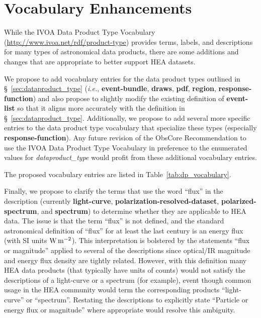 \documentclass[11pt,a4paper]{ivoa}
\begin{document}
\section{Vocabulary Enhancements}
\label{sec:voc}

While the IVOA Data Product Type Vocabulary (\url{http://www.ivoa.net/rdf/product-type}) provides terms, labels, and descriptions for many types of astronomical data products, there are some additions and changes that are appropriate to better support HEA datasets.

We propose to add vocabulary entries for the data product types outlined in \S~\ref{sec:dataproduct_type} ({\em i.e.\/}, {\bf event-bundle}, {\bf draws}, {\bf pdf}, {\bf region}, {\bf response-function}) and also propose to slightly modify the existing definition of {\bf event-list} so that it aligns more accurately with the definition in \S~\ref{sec:dataproduct_type}.  Additionally, we propose to add several more specific entries to the data product type vocabulary that specialize these types (especially {\bf response-function}).  Any future revision of the ObsCore Recommendation to use the IVOA Data Product Type Vocabulary in preference to the enumerated values for {\em dataproduct\_type\/} would profit from these additional vocabulary entries.

The proposed vocabulary entries are listed in Table~\ref{tab:dp_vocabulary}.

Finally, we propose to clarify the terms that use the word ``flux'' in the description (currently {\bf light-curve}, {\bf polarization-resolved-dataset}, {\bf polarized-spectrum}, and {\bf spectrum}) to determine whether they are applicable to HEA data.  The issue is that the term ``flux'' is not defined, and the standard astronomical definition of ``flux'' for at least the last century is an energy flux (with SI units $\rm W\,m^{-2}$).  This interpretation is bolstered by the statements ``flux or magnitude'' applied to several of the descriptions since optical/IR magnitude and energy flux density are tightly related.  However, with this definition many HEA data products (that typically have units of counts) would not satisfy the descriptions of a light-curve or a spectrum (for example), event though common usage in the HEA community would term the corresponding products ``light-curve'' or ``spectrum''.  Restating the descriptions to explicitly state ``Particle or energy flux or magnitude'' where appropriate would resolve this ambiguity.
\end{document}
